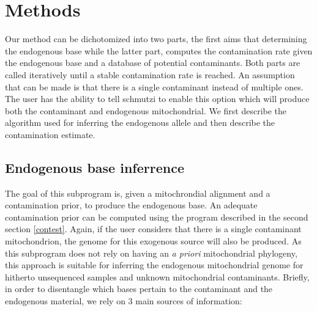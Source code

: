 \documentclass[a4paper,12pt]{article}
\begin{document}


\section{Methods}

Our method can be dichotomized into two parts, the first aims that determining the endogenous base while the latter part, computes the contamination rate given the endogenous base and a database of potential contaminants. Both parts are called iteratively until a stable contamination rate is reached. An assumption that can be made is that there is a single contaminant instead of multiple ones. The user has the ability to tell schmutzi to enable this option which will produce both the contaminant and endogenous mitochondrial. We first describe the algorithm used for inferring the endogenous allele and then describe the contamination estimate. 

\subsection{Endogenous base inferrence}

\label{endogenous}
The goal of this subprogram is, given a mitochrondial alignment and a contamination prior, to produce the endogenous base. An adequate contamination prior can be computed using the program described in the second section \ref{contest}. Again, if the user considers that there is a single contaminant mitochondrion, the genome for this exogenous source will also be produced. As this subprogram does not rely on having an {\it a priori}  mitochondrial phylogeny, this approach is suitable for inferring the endogenous mitochondrial genome for hitherto unsequenced samples and unknown mitochondrial contaminants. Briefly, in order to disentangle which bases pertain to the contaminant and the endogenous material, we rely on 3 main sources of information:
\end{document}
